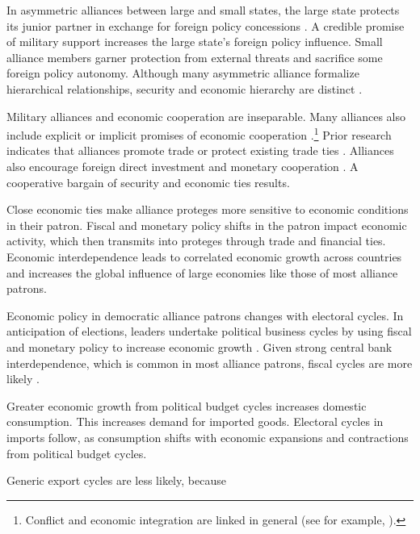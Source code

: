 \documentclass[12pt]{article}
\begin{document}
In asymmetric alliances between large and small states, the large state protects its junior partner in exchange for foreign policy concessions \citep{Morrow1991}.
A credible promise of military support increases the large state's foreign policy influence. 
Small alliance members garner protection from external threats and sacrifice some foreign policy autonomy. 
Although many asymmetric alliance formalize hierarchical relationships, security and economic hierarchy are distinct \citep{Lake2009}. 


Military alliances and economic cooperation are inseparable.
Many alliances also include explicit or implicit promises of economic cooperation \citep{GowaMansfield2004, LongLeeds2006, Davis2008, Poast2012}.\footnote{Conflict and economic integration are linked in general (see for example, \citep{GartzkeLi2003, Chen2021}).}
Prior research indicates that alliances promote trade \citep{Gowa1995, GowaMansfield2004, Haim2016} or protect existing trade ties \citep{Fordham2010}.
Alliances also encourage foreign direct investment \citep{LiVashchilko2010} and monetary cooperation \citep{Li2003}.
A cooperative bargain of security and economic ties results. 


Close economic ties make alliance proteges more sensitive to economic conditions in their patron.
Fiscal and monetary policy shifts in the patron impact economic activity, which then transmits into proteges through trade and financial ties. 
Economic interdependence leads to correlated economic growth across countries \citep{ArtisZhang1999, Kayser2006} and increases the global influence of large economies like those of most alliance patrons.


Economic policy in democratic alliance patrons changes with electoral cycles.
In anticipation of elections, leaders undertake political business cycles by using fiscal and monetary policy to increase economic growth \citep{Tufte1978, Rogoff1987}. 
Given strong central bank interdependence, which is common in most alliance patrons, fiscal cycles are more likely \citep{ClarkHallerberg2000}. 


Greater economic growth from political budget cycles increases domestic consumption.
This increases demand for imported goods. 
Electoral cycles in imports follow, as consumption shifts with economic expansions and contractions from political budget cycles.  


Generic export cycles are less likely, because 
\end{document}
